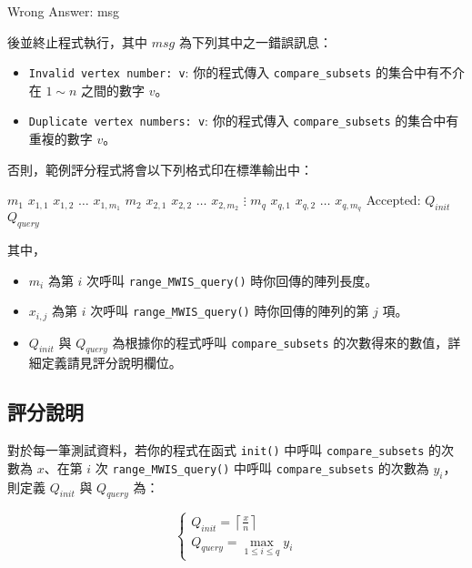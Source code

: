 \begin{format}
\f{
Wrong Answer: msg 
}
\end{format}

後並終⽌程式執⾏，其中 \(msg\) 為下列其中之⼀錯誤訊息：

\begin{itemize}
\tightlist
\item
  \texttt{Invalid\ vertex\ number:\ v}: 你的程式傳入
  \texttt{compare\_subsets} 的集合中有不介在 \(1\sim n\) 之間的數字
  \(v\)。
\item
  \texttt{Duplicate\ vertex\ numbers:\ v}: 你的程式傳入
  \texttt{compare\_subsets} 的集合中有重複的數字 \(v\)。
\end{itemize}

否則，範例評分程式將會以下列格式印在標準輸出中：

\begin{format}
\f{
$m_1$
$x_{1, 1}$ $x_{1, 2}$ $\ldots$ $x_{1, m_1}$
$m_2$
$x_{2, 1}$ $x_{2, 2}$ $\ldots$ $x_{2, m_2}$
$\vdots$
$m_q$
$x_{q, 1}$ $x_{q, 2}$ $\ldots$ $x_{q, m_q}$
Accepted: $Q_{init}$ $Q_{query}$
}
\end{format}

其中，

\begin{itemize}
\tightlist
\item
  \(m_i\) 為第 \(i\) 次呼叫 \texttt{range\_MWIS\_query()}
  時你回傳的陣列長度。
\item
  \(x_{i, j}\) 為第 \(i\) 次呼叫 \texttt{range\_MWIS\_query()}
  時你回傳的陣列的第 \(j\) 項。
\item
  \(Q_{init}\) 與 \(Q_{query}\) 為根據你的程式呼叫
  \texttt{compare\_subsets} 的次數得來的數值，詳細定義請見評分說明欄位。
\end{itemize}

\subsection{評分說明}

對於每一筆測試資料，若你的程式在函式 \texttt{init()} 中呼叫
\texttt{compare\_subsets} 的次數為 \(x\)、在第 \(i\) 次
\texttt{range\_MWIS\_query()} 中呼叫 \texttt{compare\_subsets} 的次數為
\(y_i\)，則定義 \(Q_{init}\) 與 \(Q_{query}\) 為：

\[
\begin{cases}
Q_{init} = \left\lceil \displaystyle\frac{x}{n} \right\rceil\\
Q_{query} = \displaystyle\max_{1 \leq i \leq q} y_i
\end{cases}
\]

